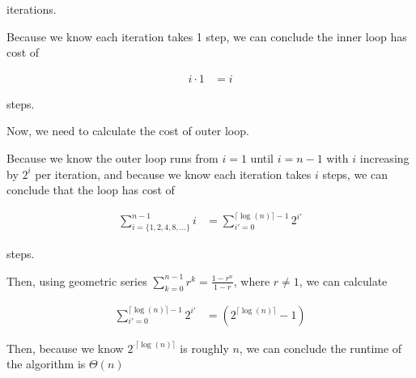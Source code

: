 \documentclass[12pt]{article}
\begin{document}
\begin{enumerate}[a.]
\begin{mdframed}
        iterations.

        \bigskip

        Because we know each iteration takes 1 step, we can conclude the inner
        loop has cost of

        \begin{align}
            i \cdot 1 &= i
        \end{align}

        steps.

        \bigskip

        Now, we need to calculate the cost of outer loop.

        \bigskip

        Because we know the outer loop runs from $i = 1$ until $i = n-1$ with $i$ increasing
        by $2^i$ per iteration, and because we know each iteration takes $i$ steps, we can
        conclude that the loop has cost of

        \color{red}
        \begin{align}
            \sum\limits_{i= \{1,2,4,8,\dots\}}^{n-1} i &= \sum\limits_{i'=0}^{\lceil \log (n) \rceil - 1} 2^{i'}
        \end{align}
        \color{black}

        steps.

        \bigskip

        Then, using geometric series $\sum\limits_{k=0}^{n-1} r^k = \frac{1-r^n}{1-r}$, where $r \neq 1$, we can calculate

        \color{red}
        \begin{align}
            \sum\limits_{i'=0}^{\lceil \log (n) \rceil - 1} 2^{i'} &= (2^{\lceil \log(n) \rceil} - 1)
        \end{align}
        \color{black}

        \bigskip

        Then, because we know \color{red}$2^{\cdot \lceil \log(n) \rceil}$\color{black}
        is roughly \color{red}$n$\color{black}, we can conclude the runtime of the
        algorithm is $\Theta(n)$

    \end{mdframed}


\end{enumerate}
\end{document}
